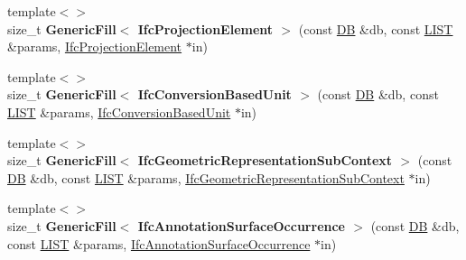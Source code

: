 \begin{DoxyCompactItemize}
\item 
\hypertarget{namespace_assimp_1_1_s_t_e_p_ab0dcc515586ebd91e71a13d477ab3892}{{\footnotesize template$<$$>$ }\\size\+\_\+t {\bfseries Generic\+Fill$<$ Ifc\+Projection\+Element $>$} (const \hyperlink{class_assimp_1_1_s_t_e_p_1_1_d_b}{D\+B} \&db, const \hyperlink{class_assimp_1_1_s_t_e_p_1_1_e_x_p_r_e_s_s_1_1_l_i_s_t}{L\+I\+S\+T} \&params, \hyperlink{struct_assimp_1_1_i_f_c_1_1_ifc_projection_element}{Ifc\+Projection\+Element} $\ast$in)}\label{namespace_assimp_1_1_s_t_e_p_ab0dcc515586ebd91e71a13d477ab3892}

\item 
\hypertarget{namespace_assimp_1_1_s_t_e_p_abd778e2819dbd2796b3bae3be17eb676}{{\footnotesize template$<$$>$ }\\size\+\_\+t {\bfseries Generic\+Fill$<$ Ifc\+Conversion\+Based\+Unit $>$} (const \hyperlink{class_assimp_1_1_s_t_e_p_1_1_d_b}{D\+B} \&db, const \hyperlink{class_assimp_1_1_s_t_e_p_1_1_e_x_p_r_e_s_s_1_1_l_i_s_t}{L\+I\+S\+T} \&params, \hyperlink{struct_assimp_1_1_i_f_c_1_1_ifc_conversion_based_unit}{Ifc\+Conversion\+Based\+Unit} $\ast$in)}\label{namespace_assimp_1_1_s_t_e_p_abd778e2819dbd2796b3bae3be17eb676}

\item 
\hypertarget{namespace_assimp_1_1_s_t_e_p_aeee6d123016f23c71683c46a57274747}{{\footnotesize template$<$$>$ }\\size\+\_\+t {\bfseries Generic\+Fill$<$ Ifc\+Geometric\+Representation\+Sub\+Context $>$} (const \hyperlink{class_assimp_1_1_s_t_e_p_1_1_d_b}{D\+B} \&db, const \hyperlink{class_assimp_1_1_s_t_e_p_1_1_e_x_p_r_e_s_s_1_1_l_i_s_t}{L\+I\+S\+T} \&params, \hyperlink{struct_assimp_1_1_i_f_c_1_1_ifc_geometric_representation_sub_context}{Ifc\+Geometric\+Representation\+Sub\+Context} $\ast$in)}\label{namespace_assimp_1_1_s_t_e_p_aeee6d123016f23c71683c46a57274747}

\item 
\hypertarget{namespace_assimp_1_1_s_t_e_p_a0ddf9b497f15898847a8603cc1aa5ee5}{{\footnotesize template$<$$>$ }\\size\+\_\+t {\bfseries Generic\+Fill$<$ Ifc\+Annotation\+Surface\+Occurrence $>$} (const \hyperlink{class_assimp_1_1_s_t_e_p_1_1_d_b}{D\+B} \&db, const \hyperlink{class_assimp_1_1_s_t_e_p_1_1_e_x_p_r_e_s_s_1_1_l_i_s_t}{L\+I\+S\+T} \&params, \hyperlink{struct_assimp_1_1_i_f_c_1_1_ifc_annotation_surface_occurrence}{Ifc\+Annotation\+Surface\+Occurrence} $\ast$in)}\label{namespace_assimp_1_1_s_t_e_p_a0ddf9b497f15898847a8603cc1aa5ee5}


\end{DoxyCompactItemize}
